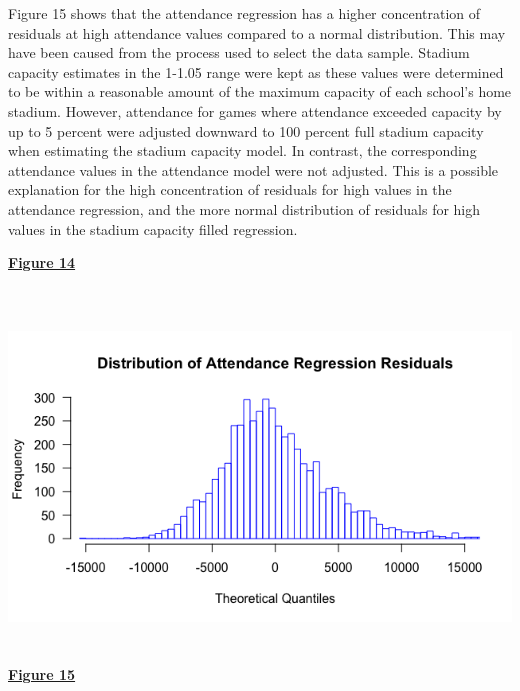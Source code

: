 \documentclass[preprint,12pt,times]{elsarticle}
\begin{document}
Figure 15 shows that the attendance regression has a higher concentration of residuals at high attendance values compared to a normal distribution.  This may have been caused from the process used to select the data sample.  Stadium capacity estimates in the 1-1.05 range were kept as these values were determined to be within a reasonable amount of the maximum capacity of each school's home stadium.  However, attendance for games where attendance exceeded capacity by up to 5 percent were adjusted downward to 100 percent full stadium capacity when estimating the stadium capacity model.  In contrast, the corresponding attendance values in the attendance model were not adjusted.  This is a possible explanation for the high concentration of residuals for high values in the attendance regression, and the more normal distribution of residuals for high values in the stadium capacity filled regression.

\newpage
\noindent
\begin{large}
\ul{\textbf{Figure 14}}
\end{large}\\

\includegraphics [width=\linewidth, height=9cm]{Picture14.png}
\begin{large}
\ul{\textbf{Figure 15}}
\end{large}\\
\end{document}
